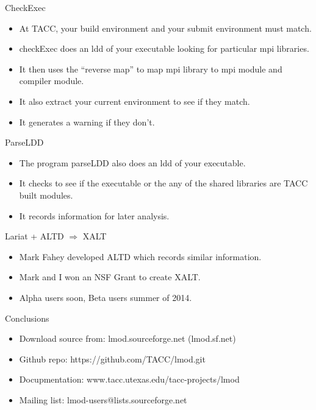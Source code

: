 \documentclass{beamer}
\begin{document}
\begin{frame}{CheckExec}
  \begin{itemize}
    \item At TACC, your build environment and your submit environment
      must match.
    \item checkExec does an ldd of your executable looking for particular mpi libraries.
    \item It then uses the ``reverse map'' to map mpi library to mpi
      module and compiler module.
    \item It also extract your current environment to see if they match.
    \item It generates a warning if they don't.
  \end{itemize}
\end{frame}

\begin{frame}{ParseLDD}
  \begin{itemize}
    \item The program parseLDD also does an ldd of your executable.
    \item It checks to see if the executable or the any of the shared
      libraries are TACC built modules.
    \item It records information for later analysis.
  \end{itemize}
\end{frame}

\begin{frame}{Lariat + ALTD $\Rightarrow$ XALT}
  \begin{itemize}
    \item Mark Fahey developed ALTD which records similar information.
    \item Mark and I won an NSF Grant to create XALT.
    \item Alpha users soon, Beta users summer of 2014.
  \end{itemize}
\end{frame}

\begin{frame}{Conclusions}
  \begin{itemize}
    \item Download source from: lmod.sourceforge.net (lmod.sf.net)
    \item Github repo: https://github.com/TACC/lmod.git
    \item Docupmentation: www.tacc.utexas.edu/tacc-projects/lmod
    \item Mailing list: lmod-users@lists.sourceforge.net
  \end{itemize}
\end{frame}
\end{document}
